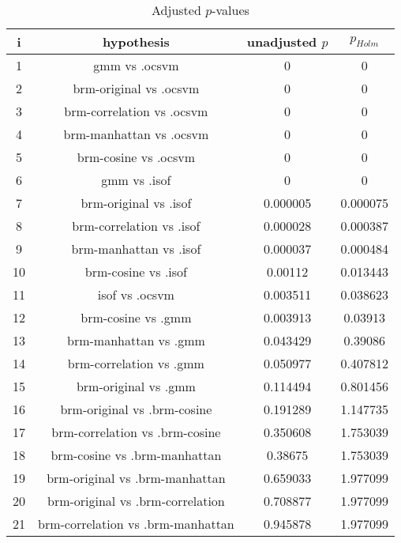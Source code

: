 \documentclass[a4paper,10pt]{article}
\begin{document}
\begin{landscape}
\begin{table}[!htp]
\centering\scriptsize
\begin{tabular}{cccc}
i&hypothesis&unadjusted $p$&$p_{Holm}$\\
\hline1&gmm vs .ocsvm&0&0\\
2&brm-original vs .ocsvm&0&0\\
3&brm-correlation vs .ocsvm&0&0\\
4&brm-manhattan vs .ocsvm&0&0\\
5&brm-cosine vs .ocsvm&0&0\\
6&gmm vs .isof&0&0\\
7&brm-original vs .isof&0.000005&0.000075\\
8&brm-correlation vs .isof&0.000028&0.000387\\
9&brm-manhattan vs .isof&0.000037&0.000484\\
10&brm-cosine vs .isof&0.00112&0.013443\\
11&isof vs .ocsvm&0.003511&0.038623\\
12&brm-cosine vs .gmm&0.003913&0.03913\\
13&brm-manhattan vs .gmm&0.043429&0.39086\\
14&brm-correlation vs .gmm&0.050977&0.407812\\
15&brm-original vs .gmm&0.114494&0.801456\\
16&brm-original vs .brm-cosine&0.191289&1.147735\\
17&brm-correlation vs .brm-cosine&0.350608&1.753039\\
18&brm-cosine vs .brm-manhattan&0.38675&1.753039\\
19&brm-original vs .brm-manhattan&0.659033&1.977099\\
20&brm-original vs .brm-correlation&0.708877&1.977099\\
21&brm-correlation vs .brm-manhattan&0.945878&1.977099\\
\hline
\end{tabular}
\caption{Adjusted $p$-values}
\end{table}

\end{landscape}
\end{document}

